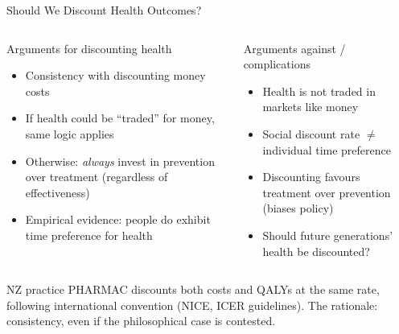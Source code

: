 \documentclass[aspectratio=169, 12pt]{beamer}
\begin{document}
\begin{frame}{Should We Discount Health Outcomes?}
  \begin{columns}
      \begin{block}{Arguments for discounting health}
        \begin{itemize}
          \item Consistency with discounting money costs
          \item If health could be ``traded'' for money, same logic applies
          \item Otherwise: \emph{always} invest in prevention over treatment (regardless of
                effectiveness)
          \item Empirical evidence: people do exhibit time preference for health
        \end{itemize}
      \end{block}
      \begin{alertblock}{Arguments against / complications}
        \begin{itemize}
          \item Health is not traded in markets like money
          \item Social discount rate $\neq$ individual time preference
          \item Discounting favours treatment over prevention (biases policy)
          \item Should future generations' health be discounted?
        \end{itemize}
      \end{alertblock}
  \end{columns}
  \vspace{0.3em}
  \begin{exampleblock}{NZ practice}
    PHARMAC discounts both costs and QALYs at the same rate, following international convention
    (NICE, ICER guidelines). The rationale: consistency, even if the philosophical case is contested.
  \end{exampleblock}
\end{frame}
\end{document}
